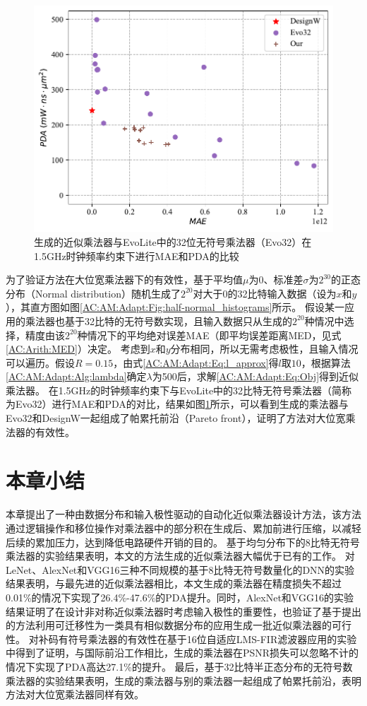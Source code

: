 \begin{figure}[!h]
    \centering
    \includegraphics[width=0.8\linewidth]{figs/AC-AM-Adapt-half-normal_32x32_PDA_MAE.pdf}
    \caption{生成的近似乘法器与EvoLite中的32位无符号乘法器（Evo32）在1.5GHz时钟频率约束下进行MAE和PDA的比较}
    \label{AC:AM:Adapt:Fig:half-norm_32x32_PDA_MAE}
\end{figure}

为了验证方法在大位宽乘法器下的有效性，基于平均值$\mu$为0、标准差$\sigma$为$2^{30}$的正态分布（Normal distribution）随机生成了$2^{20}$对大于0的32比特输入数据（设为$x$和$y$），其直方图如图\ref{AC:AM:Adapt:Fig:half-normal_histograms}所示。
假设某一应用的乘法器也基于32比特的无符号数实现，且输入数据只从生成的$2^{20}$种情况中选择，精度由该$2^{20}$种情况下的平均绝对误差MAE（即平均误差距离MED，见式\eqref{AC:Arith:MED}）决定。
考虑到$x$和$y$分布相同，所以无需考虑极性，且输入情况可以遍历。假设$R=0.15$，由式\eqref{AC:AM:Adapt:Eq:l_approx}得$l$取$10$，根据算法\ref{AC:AM:Adapt:Alg:lambda}确定$\lambda$为500后，求解\eqref{AC:AM:Adapt:Eq:Obj}得到近似乘法器。
在1.5GHz的时钟频率约束下与EvoLite\cite{AC:AM:CGP_EvoLite}中的32比特无符号乘法器（简称为Evo32）进行MAE和PDA的对比，结果如图\ref{AC:AM:Adapt:Fig:half-norm_32x32_PDA_MAE}所示，可以看到生成的乘法器与Evo32和DesignW一起组成了帕累托前沿（Pareto front），证明了方法对大位宽乘法器的有效性。

\section{本章小结}


本章提出了一种由数据分布和输入极性驱动的自动化近似乘法器设计方法，该方法通过逻辑操作和移位操作对乘法器中的部分积在生成后、累加前进行压缩，以减轻后续的累加压力，达到降低电路硬件开销的目的。
基于均匀分布下的8比特无符号乘法器的实验结果表明，本文的方法生成的近似乘法器大幅优于已有的工作。
对LeNet、AlexNet和VGG16三种不同规模的基于8比特无符号数量化的DNN的实验结果表明，与最先进的近似乘法器相比，本文生成的乘法器在精度损失不超过0.01\%的情况下实现了26.4\%-47.6\%的PDA提升。同时，AlexNet和VGG16的实验结果证明了在设计非对称近似乘法器时考虑输入极性的重要性，也验证了基于提出的方法利用可迁移性为一类具有相似数据分布的应用生成一批近似乘法器的可行性。
对补码有符号乘法器的有效性在基于16位自适应LMS-FIR滤波器应用的实验中得到了证明，与国际前沿工作相比，生成的乘法器在PSNR损失可以忽略不计的情况下实现了PDA高达27.1\%的提升。
最后，基于32比特半正态分布的无符号数乘法器的实验结果表明，生成的乘法器与别的乘法器一起组成了帕累托前沿，表明方法对大位宽乘法器同样有效。